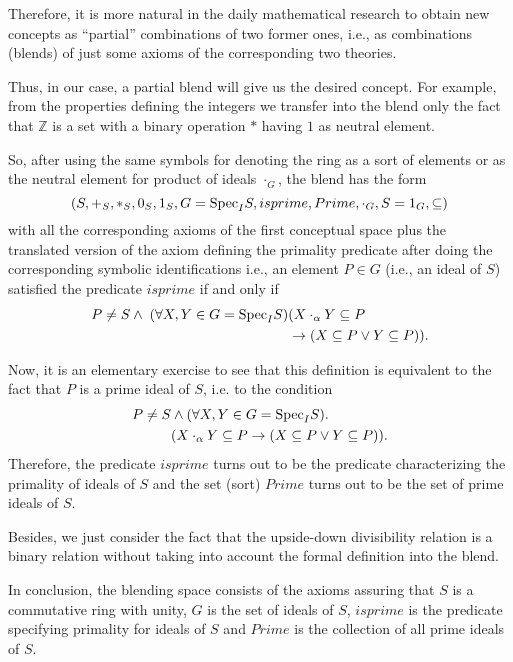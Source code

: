 Therefore, it is more natural in the daily mathematical research to
obtain new concepts as ``partial'' combinations of two former ones,
i.e., as combinations (blends) of just some axioms of the
corresponding two theories.
 
Thus, in our case, a partial blend will give us the desired
concept. For example, from the properties defining the integers we
transfer into the blend only the fact that $\mathbb{Z}$ is a set with
a binary operation $*$ having $1$ as neutral element.

So, after using the same symbols for denoting the ring as a sort of
elements or as the neutral element for product of ideals $\cdot_G$,
the blend has the form
%
\[(S, +_S, *_S, 0_S, 1_S, G={\rm Spec}_IS, isprime, Prime, \cdot_G, S=1_G, \subseteq)\]
with all the corresponding axioms of the first conceptual space plus the translated version of the axiom defining the primality predicate after doing the corresponding symbolic identifications i.e., an element $P \in G$ (i.e., an ideal of $S$) satisfied the predicate $isprime$ if and only if 
\begin{align*}
  P\neq S \wedge\; (\forall X,Y\in G={\rm Spec}_IS) & (X\cdot_{\alpha}Y\subseteq P \\
                  & \rightarrow (X\subseteq P \vee Y\subseteq P)).
\end{align*}

Now, it is an elementary exercise to see that this definition is equivalent to the fact that $P$ is a prime ideal of $S$, i.e. to the condition
\begin{align*}
P\neq S & \wedge (\forall X,Y\in G={\rm Spec}_IS). \\
        & (X\cdot_{\alpha}Y\subseteq P \rightarrow (X\subseteq P \vee Y\subseteq P)).
\end{align*}
Therefore, the predicate $isprime$ turns out to be the predicate characterizing the primality of ideals of $S$ and the set (sort) $Prime$ turns out to be the set of prime ideals of $S$.

Besides, we just consider the fact that the upside-down divisibility
relation is a binary relation without taking into account the formal
definition into the blend.


In conclusion, the blending space consists of the axioms assuring that $S$ is a commutative ring with unity, $G$ is the set of ideals of $S$, $isprime$ is the predicate specifying primality for ideals of $S$ and $Prime$ is the collection of all prime ideals of $S$. 

